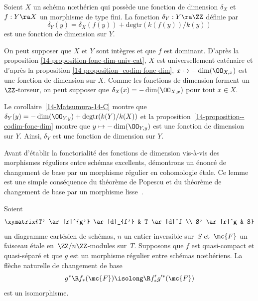 \documentclass[10pt]{../fichiers-configuration-latex/smfart}
\begin{document}
\begin{corollaire2} \label{14-coro-fonction-dim-induite-tf} Soient $X$ un schéma nœthérien qui
possède une fonction de dimension $\delta_X$ et $f  :  Y \ra X$ un morphisme de type fini. La
fonction $\delta_Y  :  Y \ra \ZZ$ définie par $$\delta_Y(y) =  \delta_X(f(y))  +
\mathrm{degtr}\left(k(f(y))/k(y)\right)$$ est une fonction de dimension sur $Y$.  \end{corollaire2}


\begin{démo} On peut supposer que $X$ et $Y$ sont intègres et que $f$ est dominant. D'après la
proposition \ref{14-proposition-fonc-dim-univ-cat}, $X$ est universellement caténaire et d'après la
proposition  \ref{14-proposition--codim-fonc-dim}, $x\mapsto -\dim(\OO_{X,x})$ est une fonction de
dimension sur $X$. Comme les fonctions de dimension forment un $\ZZ$-torseur, on peut supposer que
$\delta_X(x)  =  -\dim(\OO_{X,x})$ pour tout $x\in X$.

Le corollaire~\ref{14-Matsumura-14-C} montre que $\delta_Y(y) =-\dim(\OO_{Y,y}) +
\mathrm{degtr}(k(Y)/k(X))$ et la proposition~\ref{14-proposition--codim-fonc-dim} montre que $y
\mapsto -\dim(\OO_{Y,y})$ est une fonction de dimension sur $Y$. Ainsi, $\delta_Y$ est une fonction
de dimension sur $Y$.  \end{démo}

\medskip Avant d'établir la fonctorialité des fonctions de dimension vis-à-vis des morphismes
réguliers entre schémas excellents, démontrons un énoncé de changement de base par un morphisme
régulier en cohomologie étale. Ce lemme est une simple conséquence du théorème de Popescu
 et du théorème de changement de base par un morphisme
lisse~.

\begin{lemme2} \label{14-lemme-cb-regulier} Soient $$\xymatrix{T' \ar[r]^{g'} \ar[d]_{f'} & T
\ar[d]^f \\ S' \ar[r]^g & S}$$ un diagramme cartésien de schémas, $n$ un entier inversible sur~$S$
et~$\mc{F}$ un faisceau étale en~$\ZZ/n\ZZ$-modules sur~$T$. Supposons que $f$ est quasi-compact et
quasi-séparé et que $g$ est un morphisme régulier entre schémas nœthériens. La flèche naturelle de
changement de base $$g^* \R f_*  (\mc{F})  \isolong   \R f'_* g'^*  (\mc{F})$$ est un isomorphisme.
\end{lemme2}
\end{document}
